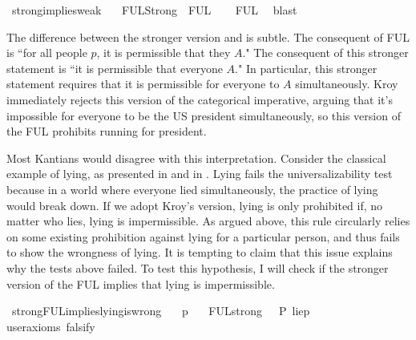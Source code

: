 \begin{isabellebody}
\isanewline
{}\isamarkupfalse%
\ strong{\isacharunderscore}implies{\isacharunderscore}weak{\isacharcolon}\isanewline
\ \ \ {\isachardoublequoteopen}FUL{\isacharunderscore}Strong\ {\isasymlongrightarrow}\ FUL{\isachardoublequoteclose}\isanewline
%
\isadelimproof
\ \ %
\endisadelimproof
%
\isatagproof
{}\isamarkupfalse%
\ FUL\ \isamarkupfalse%
\ blast\isanewline
%
%
\endisatagproof
{\isafoldproof}%
%
\isadelimproof
%
\endisadelimproof
%
\begin{isamarkuptext}%
The difference between the stronger version and  is subtle. The consequent of FUL is ``for all people $p$,
it is permissible that they $A$." The consequent of this stronger statement is ``it is permissible that 
everyone $A$." In particular, this stronger statement requires that it is permissible for everyone to
 $A$ simultaneously. Kroy immediately rejects this version of the categorical imperative, arguing that 
it's impossible for everyone to be the US president simultaneously, so this version of the FUL prohibits
running for president.

Most Kantians would disagree with this interpretation. Consider the classical example of lying, as presented 
in \cite{kemp} and in \cite{KorsgaardFUL}. Lying fails the universalizability test because in a 
world where everyone lied simultaneously, the practice of lying would break down. If we adopt Kroy's 
version, lying is only prohibited if, no matter who lies, lying is impermissible. As argued above, this 
rule circularly relies on some existing prohibition against lying for a particular person, and thus 
fails to show the wrongness of lying. It is tempting to claim that this issue explains why the tests 
above failed. To test this hypothesis, I will check if the stronger version 
of the FUL implies that lying is impermissible.%
\end{isamarkuptext}\isamarkuptrue%
\isamarkupfalse%
\ strongFUL{\isacharunderscore}implies{\isacharunderscore}lying{\isacharunderscore}is{\isacharunderscore}wrong{\isacharcolon}\isanewline
\ \ \ p\isanewline
\ \ \ {\isachardoublequoteopen}FUL{\isacharunderscore}strong\ {\isasymlongrightarrow}\ {\isasymTurnstile}{\isacharparenleft}\isactrlbold {\isasymnot}\ P\ {\isacharbraceleft}lie{\isacharparenleft}p{\isacharparenright}{\isacharbraceright}{\isacharparenright}{\isachardoublequoteclose}\isanewline
\ \ \isamarkupfalse%
{\isacharbrackleft}user{\isacharunderscore}axioms{\isacharcomma}\ falsify{\isacharbrackright}%
\isadelimproof
\ %
\endisadelimproof
%
\isatagproof
{}\isamarkupfalse%
\isanewline
%
\end{isabellebody}
